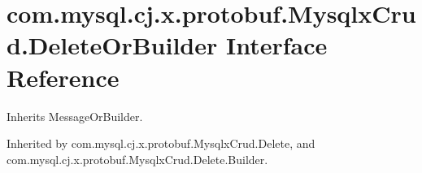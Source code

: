 \hypertarget{interfacecom_1_1mysql_1_1cj_1_1x_1_1protobuf_1_1_mysqlx_crud_1_1_delete_or_builder}{}\section{com.\+mysql.\+cj.\+x.\+protobuf.\+Mysqlx\+Crud.\+Delete\+Or\+Builder Interface Reference}
\label{interfacecom_1_1mysql_1_1cj_1_1x_1_1protobuf_1_1_mysqlx_crud_1_1_delete_or_builder}


Inherits Message\+Or\+Builder.



Inherited by com.\+mysql.\+cj.\+x.\+protobuf.\+Mysqlx\+Crud.\+Delete, and com.\+mysql.\+cj.\+x.\+protobuf.\+Mysqlx\+Crud.\+Delete.\+Builder.

